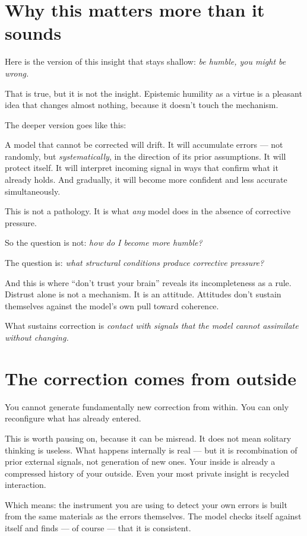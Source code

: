 \documentclass{article}
\begin{document}
\section*{Why this matters more than it sounds}

Here is the version of this insight that stays shallow: \textit{be humble, you might be wrong.}

That is true, but it is not the insight. Epistemic humility as a virtue is a pleasant idea that changes almost nothing, because it doesn't touch the mechanism.

The deeper version goes like this:

A model that cannot be corrected will drift. It will accumulate errors --- not randomly, but \textit{systematically}, in the direction of its prior assumptions. It will protect itself. It will interpret incoming signal in ways that confirm what it already holds. And gradually, it will become more confident and less accurate simultaneously.

This is not a pathology. It is what \textit{any} model does in the absence of corrective pressure.

So the question is not: \textit{how do I become more humble?}

The question is: \textit{what structural conditions produce corrective pressure?}

And this is where ``don't trust your brain'' reveals its incompleteness as a rule. Distrust alone is not a mechanism. It is an attitude. Attitudes don't sustain themselves against the model's own pull toward coherence.

What sustains correction is \textit{contact with signals that the model cannot assimilate without changing.}

\section*{The correction comes from outside}

You cannot generate fundamentally new correction from within. You can only reconfigure what has already entered.

This is worth pausing on, because it can be misread. It does not mean solitary thinking is useless. What happens internally is real --- but it is recombination of prior external signals, not generation of new ones. Your inside is already a compressed history of your outside. Even your most private insight is recycled interaction.

Which means: the instrument you are using to detect your own errors is built from the same materials as the errors themselves. The model checks itself against itself and finds --- of course --- that it is consistent.
\end{document}
